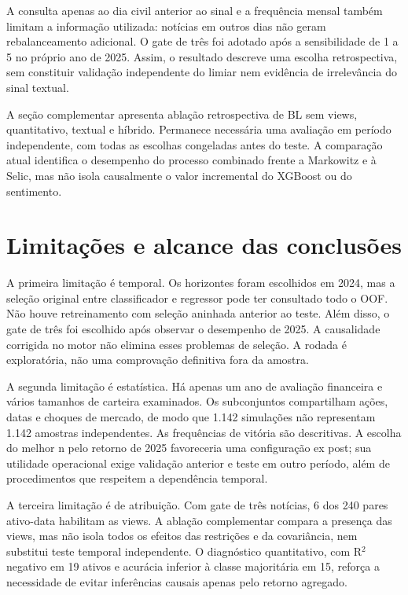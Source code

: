 A consulta apenas ao dia civil anterior ao sinal e a frequência mensal também limitam a informação utilizada: notícias em outros dias não geram rebalanceamento adicional. O gate de três foi adotado após a sensibilidade de 1 a 5 no próprio ano de 2025. Assim, o resultado descreve uma escolha retrospectiva, sem constituir validação independente do limiar nem evidência de irrelevância do sinal textual.

A seção complementar apresenta ablação retrospectiva de BL sem views, quantitativo, textual e híbrido. Permanece necessária uma avaliação em período independente, com todas as escolhas congeladas antes do teste. A comparação atual identifica o desempenho do processo combinado frente a Markowitz e à Selic, mas não isola causalmente o valor incremental do XGBoost ou do sentimento.



\section{Limitações e alcance das conclusões}
A primeira limitação é temporal. Os horizontes foram escolhidos em 2024, mas a seleção original entre classificador e regressor pode ter consultado todo o OOF. Não houve retreinamento com seleção aninhada anterior ao teste. Além disso, o gate de três foi escolhido após observar o desempenho de 2025. A causalidade corrigida no motor não elimina esses problemas de seleção. A rodada é exploratória, não uma comprovação definitiva fora da amostra.

A segunda limitação é estatística. Há apenas um ano de avaliação financeira e vários tamanhos de carteira examinados. Os subconjuntos compartilham ações, datas e choques de mercado, de modo que 1.142 simulações não representam 1.142 amostras independentes. As frequências de vitória são descritivas. A escolha do melhor n pelo retorno de 2025 favoreceria uma configuração ex post; sua utilidade operacional exige validação anterior e teste em outro período, além de procedimentos que respeitem a dependência temporal.

A terceira limitação é de atribuição. Com gate de três notícias, 6 dos 240 pares ativo-data habilitam as views. A ablação complementar compara a presença das views, mas não isola todos os efeitos das restrições e da covariância, nem substitui teste temporal independente. O diagnóstico quantitativo, com R$^{2}$ negativo em 19 ativos e acurácia inferior à classe majoritária em 15, reforça a necessidade de evitar inferências causais apenas pelo retorno agregado.

